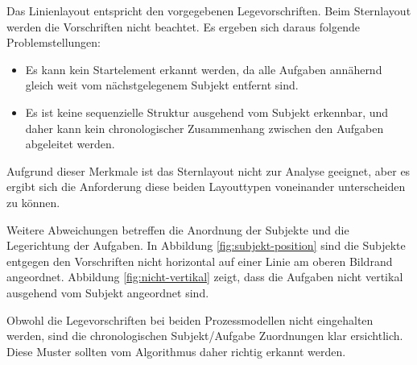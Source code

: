 Das Linienlayout entspricht den vorgegebenen Legevorschriften. Beim Sternlayout werden die Vorschriften nicht beachtet. Es ergeben sich daraus folgende Problemstellungen:
\begin{itemize}
	\item Es kann kein Startelement erkannt werden, da alle Aufgaben annähernd gleich weit vom nächstgelegenem Subjekt entfernt sind.
	\item Es ist keine sequenzielle Struktur ausgehend vom Subjekt erkennbar, und daher kann kein chronologischer Zusammenhang zwischen den Aufgaben abgeleitet werden.
\end{itemize}

Aufgrund dieser Merkmale ist das Sternlayout nicht zur Analyse geeignet, aber es ergibt sich die Anforderung diese beiden Layouttypen voneinander unterscheiden zu können.

Weitere Abweichungen betreffen die Anordnung der Subjekte und die Legerichtung der Aufgaben. In Abbildung \ref{fig:subjekt-position} sind die Subjekte entgegen den Vorschriften nicht horizontal auf einer Linie am oberen Bildrand angeordnet. Abbildung \ref{fig:nicht-vertikal} zeigt, dass die Aufgaben nicht vertikal ausgehend vom Subjekt angeordnet sind.

Obwohl die Legevorschriften bei beiden Prozessmodellen nicht eingehalten werden, sind die chronologischen Subjekt/Aufgabe Zuordnungen klar ersichtlich. Diese Muster sollten vom Algorithmus daher richtig erkannt werden. 

